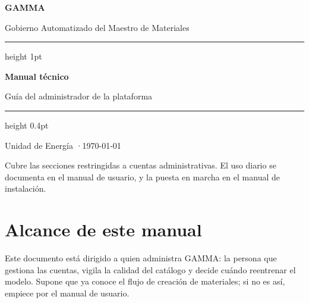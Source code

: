 %




\begin{titlepage}
\thispagestyle{empty}
\vspace*{5.5cm}
{\fontsize{46}{50}\selectfont\bfseries\color{fg} GAMMA\par}
\vspace{0.5em}
{\large\color{muted} Gobierno Automatizado del Maestro de Materiales\par}

\vspace{2.6cm}
{\color{line}\hrule height 1pt}
\vspace{1.2em}

{\huge\bfseries\color{fg} Manual técnico\par}
\vspace{0.5em}
{\large\color{muted} Guía del administrador de la plataforma\par}

\vfill
{\color{line}\hrule height 0.4pt}
\vspace{1em}
{\footnotesize\color{muted}
Unidad de Energía \quad·\quad \today\par
\vspace{0.4em}
Cubre las secciones restringidas a cuentas administrativas.
El uso diario se documenta en el manual de usuario, y la puesta en marcha en el
manual de instalación.\par}
\vspace{1cm}
\end{titlepage}

\tableofcontents
\newpage

\section{Alcance de este manual}

Este documento está dirigido a quien administra GAMMA: la persona que gestiona
las cuentas, vigila la calidad del catálogo y decide cuándo reentrenar el
modelo. Supone que ya conoce el flujo de creación de materiales; si no es así,
empiece por el manual de usuario.

